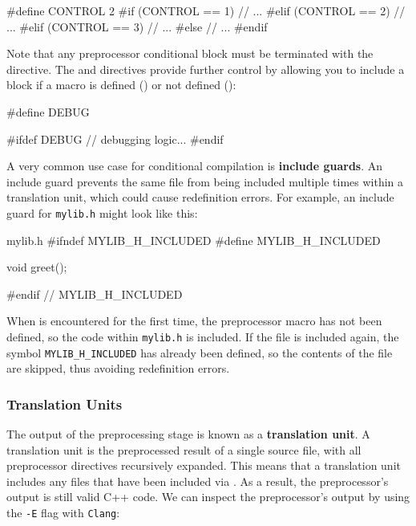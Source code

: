 \documentclass[12pt]{article}
\begin{document}
\begin{cxx}{}
#define CONTROL 2
#if (CONTROL == 1)
	// ...
#elif (CONTROL == 2)
	// ...
#elif (CONTROL == 3)
	// ...
#else
	// ...
#endif
\end{cxx}

\noindent
Note that any preprocessor conditional block must be terminated with the  directive.
The  and  directives provide further control by allowing you to include a block if a macro is defined () or not defined ():

\begin{cxx}{}
#define DEBUG

#ifdef DEBUG
	// debugging logic...
#endif
\end{cxx}

\noindent
A very common use case for conditional compilation is \textbf{include guards}.
An include guard prevents the same file from being included multiple times within a translation unit, which could cause redefinition errors.
For example, an include guard for \texttt{mylib.h} might look like this:

\begin{cxx}{mylib.h}
#ifndef MYLIB_H_INCLUDED
#define MYLIB_H_INCLUDED

void greet();

#endif // MYLIB_H_INCLUDED
\end{cxx}

\noindent
When  is encountered for the first time, the preprocessor macro  has not been defined, so the code within \texttt{mylib.h} is included.
If the file is included again, the symbol \texttt{MYLIB\_H\_INCLUDED} has already been defined, so the contents of the file are skipped, thus avoiding redefinition errors.

\subsubsection{Translation Units}
\label{sec:translation-units}

\noindent
The output of the preprocessing stage is known as a \textbf{translation unit}.
A translation unit is the preprocessed result of a single source file, with all preprocessor directives recursively expanded.
This means that a translation unit includes any files that have been included via .
As a result, the preprocessor's output is still valid C++ code.
We can inspect the preprocessor's output by using the \texttt{-E} flag with \texttt{Clang}:
\end{document}
